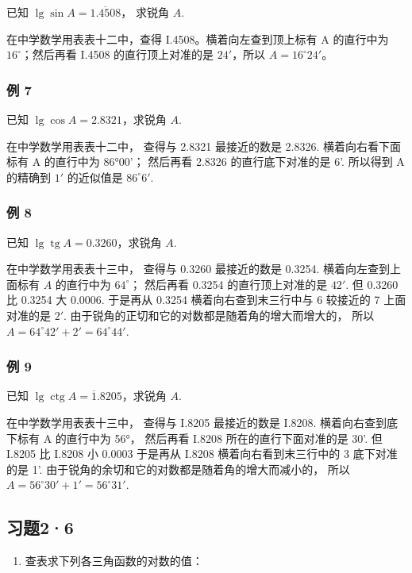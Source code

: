 已知 \(\lg \sin A = \overline{1.4508}\)， 求锐角 \(A\).

 在中学数学用表表十二中，查得
I.4508。横着向左查到顶上标有 A 的直行中为 \(16^{\circ}\)；然后再看
I.4508 的直行顶上对准的是 \(24'\)，所以 \(A=16^{\circ}24'\)。

\subsubsection{例 7}

已知 \(\lg \cos A = 2.8321\)，求锐角 \(A\).

 在中学数学用表表十二中， 查得与 2.8321 最接近的数是
2.8326. 横着向右看下面标有 A 的直行中为 86°00'； 然后再看 2.8326
的直行底下对准的是 6'. 所以得到 A 的精确到 \(1'\) 的近似值是
\(86^{\circ}6'\).

\subsubsection{例 8}

已知 \(\lg \operatorname{tg} A = 0.3260\)，求锐角 \(A\).

 在中学数学用表表十三中， 查得与 0.3260 最接近的数是
0.3254. 横着向左查到上面标有 \(A\) 的直行中为 \(64^{\circ}\)； 然后再看
0.3254 的直行顶上对准的是 \(42'\). 但 0.3260 比 0.3254 大 0.0006.
于是再从 0.3254 横着向右查到末三行中与 6 较接近的 7 上面对准的是 \(2'\).
由于锐角的正切和它的对数都是随着角的增大而增大的， 所以
\(A = 64^{\circ}42' + 2' = 64^{\circ}44'\).

\subsubsection{例 9}

已知 \(\lg \operatorname{ctg} A = \overline{1}.8205\)，求锐角 \(A\).

 在中学数学用表表十三中， 查得与 I.8205 最接近的数是
I.8208. 横着向右查到底下标有 A 的直行中为 56°， 然后再看 I.8208
所在的直行下面对准的是 30'. 但 I.8205 比 I.8208 小 0.0003 于是再从
I.8208 横着向右看到末三行中的 3 底下对准的是 1'.
由于锐角的余切和它的对数都是随着角的增大而减小的， 所以
\(A = 56^{\circ}30' + 1' = 56^{\circ}31'\).

\subsection{习题2·6}

\begin{enumerate}
\item
  查表求下列各三角函数的对数的值：
\end{enumerate}

